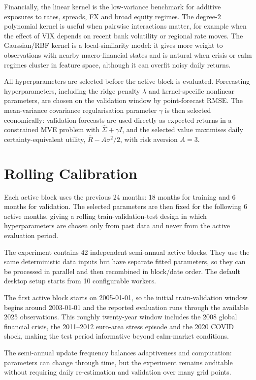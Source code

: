 ﻿\documentclass[10pt,a4paper]{article}
\begin{document}
Financially, the linear kernel is the low-variance benchmark for additive exposures to rates, spreads, FX and broad equity regimes. The degree-2 polynomial kernel is useful when pairwise interactions matter, for example when the effect of VIX depends on recent bank volatility or regional rate moves. The Gaussian/RBF kernel is a local-similarity model: it gives more weight to observations with nearby macro-financial states and is natural when crisis or calm regimes cluster in feature space, although it can overfit noisy daily returns.

All hyperparameters are selected before the active block is evaluated. Forecasting hyperparameters, including the ridge penalty \(\lambda\) and kernel-specific nonlinear parameters, are chosen on the validation window by point-forecast RMSE. The mean-variance covariance regularisation parameter \(\gamma\) is then selected economically: validation forecasts are used directly as expected returns in a constrained MVE problem with \(\widehat\Sigma+\gamma I\), and the selected value maximises daily certainty-equivalent utility, \( \bar R - A\sigma^2/2 \), with risk aversion \(A=3\).

\section{Rolling Calibration}

Each active block uses the previous 24 months: 18 months for training and 6 months for validation. The selected parameters are then fixed for the following 6 active months, giving a rolling train-validation-test design in which hyperparameters are chosen only from past data and never from the active evaluation period.

The experiment contains 42 independent semi-annual active blocks. They use the same deterministic data inputs but have separate fitted parameters, so they can be processed in parallel and then recombined in block/date order. The default desktop setup starts from 10 configurable workers.

The first active block starts on 2005-01-01, so the initial train-validation window begins around 2003-01-01 and the reported evaluation runs through the available 2025 observations. This roughly twenty-year window includes the 2008 global financial crisis, the 2011--2012 euro-area stress episode and the 2020 COVID shock, making the test period informative beyond calm-market conditions.

The semi-annual update frequency balances adaptiveness and computation: parameters can change through time, but the experiment remains auditable without requiring daily re-estimation and validation over many grid points.
\end{document}
